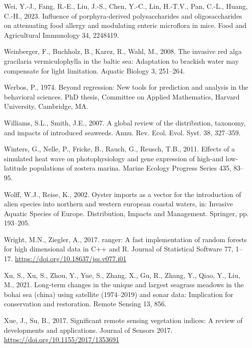 \documentclass[
  letterpaper,
  11pt,
  english,
  singlespacing,
  headsepline]{MastersDoctoralThesis}
\newlength{\cslhangindent}
\newenvironment{CSLReferences}[2] %
 {\begin{list}{}{%
  \setlength{\itemindent}{0pt}
  \setlength{\leftmargin}{0pt}
  \setlength{\parsep}{0pt}
  \ifodd #1
   \setlength{\leftmargin}{\cslhangindent}
   \setlength{\itemindent}{-1\cslhangindent}
  \fi
  \setlength{\itemsep}{#2\baselineskip}}}
 {\end{list}}
\begin{document}
\begin{CSLReferences}{1}{0}
Wei, Y.-J., Fang, R.-E., Liu, J.-S., Chen, Y.-C., Lin, H.-T.V., Pan,
C.-L., Huang, C.-H., 2023. Influence of porphyra-derived polysaccharides
and oligosaccharides on attenuating food allergy and modulating enteric
microflora in mice. Food and Agricultural Immunology 34, 2248419.

Weinberger, F., Buchholz, B., Karez, R., Wahl, M., 2008. The invasive
red alga gracilaria vermiculophylla in the baltic sea: Adaptation to
brackish water may compensate for light limitation. Aquatic Biology 3,
251--264.

Werbos, P., 1974. Beyond regression: New tools for prediction and
analysis in the behavioral sciences. PhD thesis, Committee on Applied
Mathematics, Harvard University, Cambridge, MA.

Williams, S.L., Smith, J.E., 2007. A global review of the distribution,
taxonomy, and impacts of introduced seaweeds. Annu. Rev. Ecol. Evol.
Syst. 38, 327--359.

Winters, G., Nelle, P., Fricke, B., Rauch, G., Reusch, T.B., 2011.
Effects of a simulated heat wave on photophysiology and gene expression
of high-and low-latitude populations of zostera marina. Marine Ecology
Progress Series 435, 83--95.

Wolff, W.J., Reise, K., 2002. Oyster imports as a vector for the
introduction of alien species into northern and western european coastal
waters, in: Invasive Aquatic Species of Europe. Distribution, Impacts
and Management. Springer, pp. 193--205.

Wright, M.N., Ziegler, A., 2017. {ranger}: A fast implementation of
random forests for high dimensional data in {C++} and {R}. Journal of
Statistical Software 77, 1--17.
\url{https://doi.org/10.18637/jss.v077.i01}

Xu, S., Xu, S., Zhou, Y., Yue, S., Zhang, X., Gu, R., Zhang, Y., Qiao,
Y., Liu, M., 2021. Long-term changes in the unique and largest seagrass
meadows in the bohai sea (china) using satellite (1974--2019) and sonar
data: Implication for conservation and restoration. Remote Sensing 13,
856.

Xue, J., Su, B., 2017. {Significant remote sensing vegetation indices: A
review of developments and applications}. Journal of Sensors 2017.
\url{https://doi.org/10.1155/2017/1353691}


\end{CSLReferences}
\end{document}
